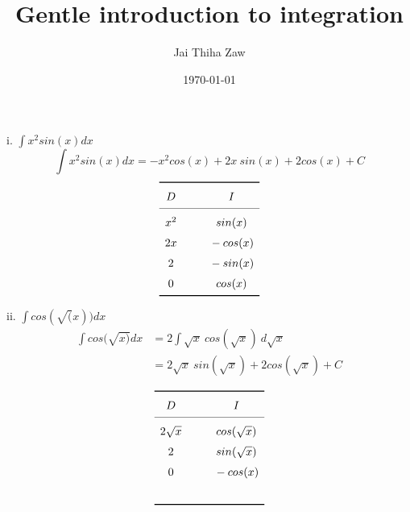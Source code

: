 \documentclass{article}
\title{Gentle introduction to integration}
\author{Jai Thiha Zaw}
\date{\today}
\newcommand{\tikzmark}[1]{%
	\tikz[overlay, remember picture, baseline] \node (#1) {};%
}
\begin{document}
	
	\maketitle
	
	i. $\int{x^2 sin(x)}dx$ 
	\begin{equation} 
		\int{x^2 sin(x)} dx 
		= -x^2 cos(x) +2x \ sin(x) + 2 cos(x) + C
	\end{equation}
	\[
	\renewcommand{\arraystretch}{1.5}
	\begin{array}{c @{\hspace*{1.0cm}} c}\toprule
		D & I \\\cmidrule{1-2}
		x^2\tikzmark{Left 1} & \tikzmark{Right 1}sin(x) \\
		2x \tikzmark{Left 2} & \tikzmark{Right 2}-cos(x) \\      
		2  \tikzmark{Left 3} & \tikzmark{Right 3}-sin(x)\\      
		0  \tikzmark{Left 4} & \tikzmark{Right 4}cos(x) \\\bottomrule
	\end{array}
	\]
	
	ii. $\int{cos(\sqrt(x))}dx$ 
		\begin{align}  
		\int {cos(\sqrt{x)}} dx 
		&= 2 \int{\sqrt{x} \ cos(\sqrt{x})} \ d\sqrt{x} \\
		&= 2 \sqrt{x} \ sin(\sqrt{x}) + 2 cos(\sqrt{x}) + C 
	\end{align}
	
	\[
	\renewcommand{\arraystretch}{1.5}
	\begin{array}{c @{\hspace*{1.0cm}} c}\toprule
		D & I \\\cmidrule{1-2}
		2 \sqrt{x} \tikzmark{Left 1} & \tikzmark{Right 1}cos(\sqrt{x}) \\
		2 \tikzmark{Left 2} & \tikzmark{Right 2} sin(\sqrt{x}) \\      
		0 \tikzmark{Left 3} & \tikzmark{Right 3}-cos(x)\\      
\\\bottomrule
	\end{array}
	\]

	
	
\end{document}
